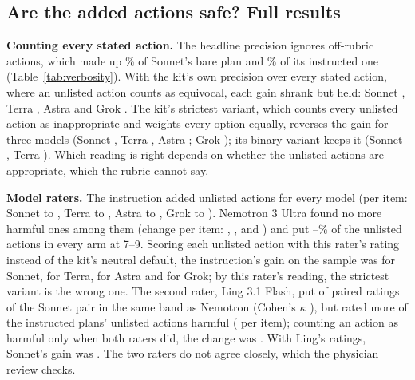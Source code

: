 \documentclass[11pt]{article}
\begin{document}
\subsection{Are the added actions safe? Full results}
\label{supp:safety}
\textbf{Counting every stated action.} The headline precision ignores off-rubric actions, which made
up \covOffSonnetBare{}\% of Sonnet's bare plan and \covOffSonnetSpec{}\% of its instructed one
(Table~\ref{tab:verbosity}). With the kit's own precision over every stated action, where an unlisted
action counts as equivocal, each gain shrank but held: Sonnet \covDAllPromptSonnet{}, Terra
\covDAllPromptTerra{}, Astra \covDAllPromptAstraExh{} and Grok \covDAllPromptGrokThorough{}. The
kit's strictest variant, which counts every unlisted action as inappropriate and weights every
option equally, reverses the gain for three models (Sonnet \covDRawSonnet{}, Terra \covDRawTerra{},
Astra \covDRawAstra{}; Grok \covDRawGrok{}); its binary variant keeps it (Sonnet
\covDBinarySonnet{}, Terra \covDBinaryTerra{}). Which reading is right depends on whether the unlisted
actions are appropriate, which the rubric cannot say.

\textbf{Model raters.} The instruction added unlisted actions for every model (per item: Sonnet
\covAuditActionsBareSonnet{} to \covAuditActionsPromptSonnet{}, Terra \covAuditActionsBareTerra{} to
\covAuditActionsPromptTerra{}, Astra \covAuditActionsBareAstra{} to \covAuditActionsPromptAstra{},
Grok \covAuditActionsBareGrok{} to \covAuditActionsPromptGrok{}). Nemotron 3 Ultra found no more
harmful ones among them (change per item: \covAuditHarmDiffSonnet{}, \covAuditHarmDiffTerra{},
\covAuditHarmDiffAstra{} and \covAuditHarmDiffGrok{}) and put
\covRatedOkSonnetNemoBare--\covRatedOkTerraNemoPrompt\% of the unlisted actions in every arm at 7--9.
Scoring each unlisted action with this rater's rating instead of the kit's neutral default, the
instruction's gain on the sample was \covRatedFSonnetNemo{} for Sonnet, \covRatedFTerraNemo{} for
Terra, \covRatedFAstraNemo{} for Astra and \covRatedFGrokNemo{} for Grok; by this rater's reading,
the strictest variant is the wrong one. The second rater, Ling 3.1 Flash, put \covAuditAgreeSonnet{}
of \covAuditAgreeActionsSonnet{} paired ratings of the Sonnet pair in the same band as Nemotron
(Cohen's $\kappa$ \covAuditKappaSonnet{}), but rated more of the instructed plans' unlisted actions
harmful (\covAuditHarmDiffSonnetLing{} per item); counting an action as harmful only when both raters
did, the change was \covAuditHarmDiffSonnetBoth{}. With Ling's ratings, Sonnet's gain was
\covRatedFSonnetLing{}. The two raters do not agree closely, which the physician review checks.
\end{document}

